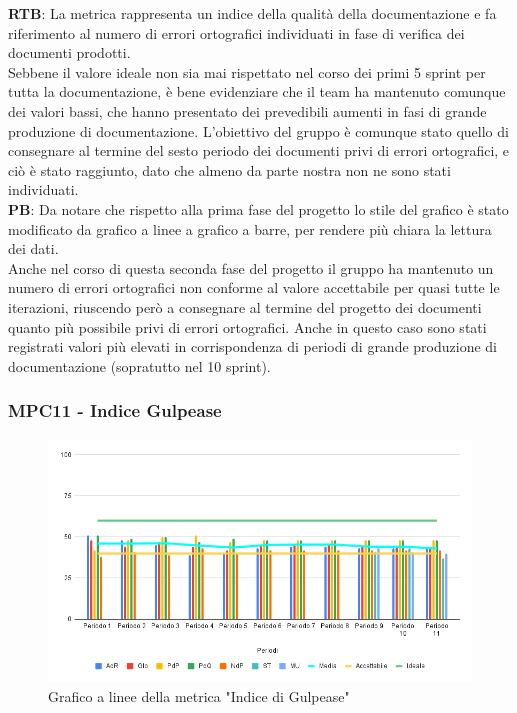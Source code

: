 \documentclass[10pt]{article}
\begin{document}
\begin{justify}
\textbf{RTB}: La metrica rappresenta un indice della qualità della documentazione e fa riferimento al numero di errori ortografici individuati in fase di verifica 
dei documenti prodotti.\\
Sebbene il valore ideale non sia mai rispettato nel corso dei primi 5 sprint per tutta la documentazione, è bene evidenziare che il team ha mantenuto comunque dei valori bassi, che hanno 
presentato dei prevedibili aumenti in fasi di grande produzione di documentazione. L'obiettivo del gruppo è comunque stato quello di consegnare al termine del sesto periodo
dei documenti privi di errori ortografici, e ciò è stato raggiunto, dato che almeno da parte nostra non ne sono stati individuati.\\

\noindent
\textbf{PB}: Da notare che rispetto alla prima fase del progetto lo stile del grafico è stato modificato da grafico a linee a grafico a barre, per rendere più chiara 
la lettura dei dati.\\
Anche nel corso di questa seconda fase del progetto il gruppo ha mantenuto un numero di errori ortografici non conforme al valore accettabile per quasi 
tutte le iterazioni, riuscendo però a consegnare al termine del progetto dei documenti quanto più possibile privi di errori ortografici. Anche in questo caso sono stati 
registrati valori più elevati in corrispondenza di periodi di grande produzione di documentazione (sopratutto nel 10 sprint).


\subsubsection{MPC11 - Indice Gulpease}

\begin{figure}[H]
  \centering
  \includegraphics[width=0.9\linewidth]{gulpease.png}
  \caption{Grafico a linee della metrica "Indice di Gulpease"}
  \label{fig:gulpease_chart}
\end{figure}


\end{justify}
\end{document}
